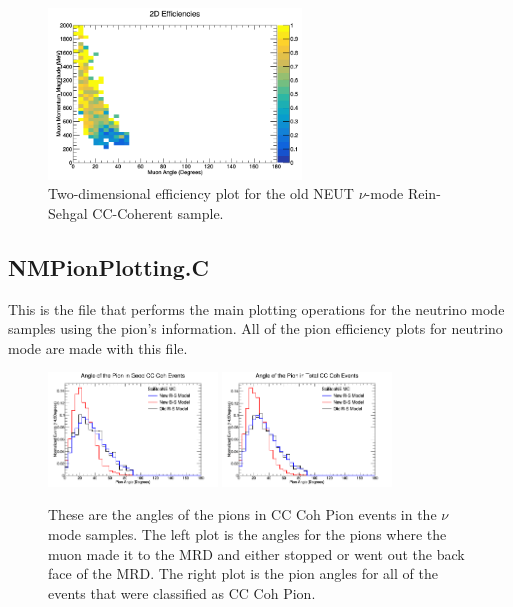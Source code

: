 \documentclass[11pt]{article}
\begin{document}
\begin{figure}[H]
\centering
\includegraphics[width=0.6\textwidth]{CCCohPlots/2DEffNMORS.png}
\caption{Two-dimensional efficiency plot for the old NEUT $\nu$-mode Rein-Sehgal CC-Coherent sample.}
\end{figure}

\subsection{NMPionPlotting.C}
This is the file that performs the main plotting operations for the neutrino mode samples using the pion's information. All of the pion efficiency plots for neutrino mode are made with this file.

\begin{figure}[H]
\centering
\includegraphics[width=0.4\textwidth]{NMPionPlottingImages/7-NMPionPlotting.png}
\includegraphics[width=0.4\textwidth]{NMPionPlottingImages/10-NMPionPlotting.png}
\caption{These are the angles of the pions in CC Coh Pion events in the $\nu$ mode samples. The left plot is the angles for the pions where the muon made it to the MRD and either stopped or went out the back face of the MRD. The right plot is the pion angles for all of the events that were classified as CC Coh Pion.}
\end{figure}
\end{document}

